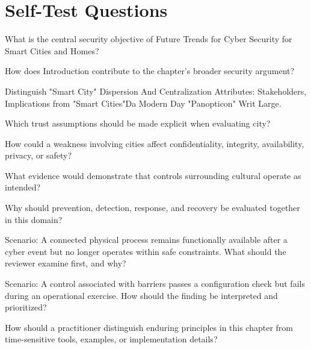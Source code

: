 \documentclass[11pt,letterpaper]{article}
\begin{document}
\section*{Self-Test Questions}
\begin{CornellRecallList}
\item What is the central security objective of Future Trends for Cyber Security for Smart Cities and Homes?
\item How does Introduction contribute to the chapter's broader security argument?
\item Distinguish "Smart City" Dispersion And Centralization Attributes: Stakeholders, Implications from "Smart Cities"Da Modern Day "Panopticon" Writ Large.
\item Which trust assumptions should be made explicit when evaluating city?
\item How could a weakness involving cities affect confidentiality, integrity, availability, privacy, or safety?
\item What evidence would demonstrate that controls surrounding cultural operate as intended?
\item Why should prevention, detection, response, and recovery be evaluated together in this domain?
\item Scenario: A connected physical process remains functionally available after a cyber event but no longer operates within safe constraints. What should the reviewer examine first, and why?
\item Scenario: A control associated with barriers passes a configuration check but fails during an operational exercise. How should the finding be interpreted and prioritized?
\item How should a practitioner distinguish enduring principles in this chapter from time-sensitive tools, examples, or implementation details?
\end{CornellRecallList}
\end{document}
